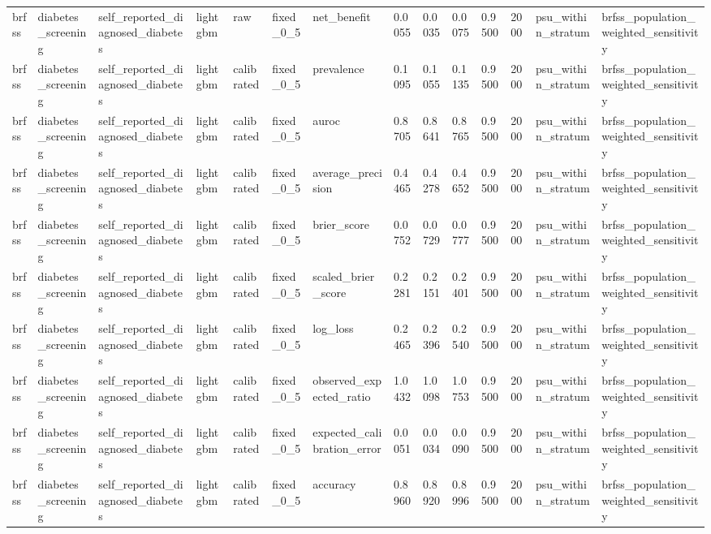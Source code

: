 \begin{tabular}{llllllllllllll}
brfss & diabetes\_screening & self\_reported\_diagnosed\_diabetes & lightgbm & raw & fixed\_0\_5 & net\_benefit & 0.0055 & 0.0035 & 0.0075 & 0.9500 & 2000 & psu\_within\_stratum & brfss\_population\_weighted\_sensitivity \\
brfss & diabetes\_screening & self\_reported\_diagnosed\_diabetes & lightgbm & calibrated & fixed\_0\_5 & prevalence & 0.1095 & 0.1055 & 0.1135 & 0.9500 & 2000 & psu\_within\_stratum & brfss\_population\_weighted\_sensitivity \\
brfss & diabetes\_screening & self\_reported\_diagnosed\_diabetes & lightgbm & calibrated & fixed\_0\_5 & auroc & 0.8705 & 0.8641 & 0.8765 & 0.9500 & 2000 & psu\_within\_stratum & brfss\_population\_weighted\_sensitivity \\
brfss & diabetes\_screening & self\_reported\_diagnosed\_diabetes & lightgbm & calibrated & fixed\_0\_5 & average\_precision & 0.4465 & 0.4278 & 0.4652 & 0.9500 & 2000 & psu\_within\_stratum & brfss\_population\_weighted\_sensitivity \\
brfss & diabetes\_screening & self\_reported\_diagnosed\_diabetes & lightgbm & calibrated & fixed\_0\_5 & brier\_score & 0.0752 & 0.0729 & 0.0777 & 0.9500 & 2000 & psu\_within\_stratum & brfss\_population\_weighted\_sensitivity \\
brfss & diabetes\_screening & self\_reported\_diagnosed\_diabetes & lightgbm & calibrated & fixed\_0\_5 & scaled\_brier\_score & 0.2281 & 0.2151 & 0.2401 & 0.9500 & 2000 & psu\_within\_stratum & brfss\_population\_weighted\_sensitivity \\
brfss & diabetes\_screening & self\_reported\_diagnosed\_diabetes & lightgbm & calibrated & fixed\_0\_5 & log\_loss & 0.2465 & 0.2396 & 0.2540 & 0.9500 & 2000 & psu\_within\_stratum & brfss\_population\_weighted\_sensitivity \\
brfss & diabetes\_screening & self\_reported\_diagnosed\_diabetes & lightgbm & calibrated & fixed\_0\_5 & observed\_expected\_ratio & 1.0432 & 1.0098 & 1.0753 & 0.9500 & 2000 & psu\_within\_stratum & brfss\_population\_weighted\_sensitivity \\
brfss & diabetes\_screening & self\_reported\_diagnosed\_diabetes & lightgbm & calibrated & fixed\_0\_5 & expected\_calibration\_error & 0.0051 & 0.0034 & 0.0090 & 0.9500 & 2000 & psu\_within\_stratum & brfss\_population\_weighted\_sensitivity \\
brfss & diabetes\_screening & self\_reported\_diagnosed\_diabetes & lightgbm & calibrated & fixed\_0\_5 & accuracy & 0.8960 & 0.8920 & 0.8996 & 0.9500 & 2000 & psu\_within\_stratum & brfss\_population\_weighted\_sensitivity \\

\end{tabular}
